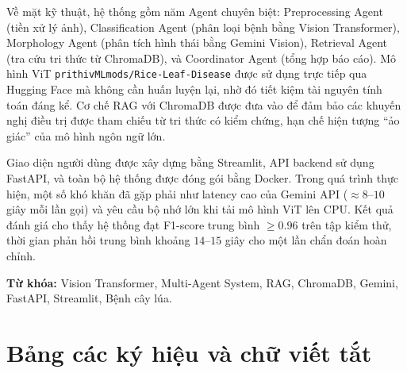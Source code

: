 \documentclass[13pt,a4paper]{extreport}
\begin{document}
Về mặt kỹ thuật, hệ thống gồm năm Agent chuyên biệt: Preprocessing Agent (tiền xử lý ảnh), Classification Agent (phân loại bệnh bằng Vision Transformer), Morphology Agent (phân tích hình thái bằng Gemini Vision), Retrieval Agent (tra cứu tri thức từ ChromaDB), và Coordinator Agent (tổng hợp báo cáo). Mô hình ViT \texttt{prithivMLmods/Rice-Leaf-Disease} được sử dụng trực tiếp qua Hugging Face mà không cần huấn luyện lại, nhờ đó tiết kiệm tài nguyên tính toán đáng kể. Cơ chế RAG với ChromaDB được đưa vào để đảm bảo các khuyến nghị điều trị được tham chiếu từ tri thức có kiểm chứng, hạn chế hiện tượng ``ảo giác'' của mô hình ngôn ngữ lớn.

Giao diện người dùng được xây dựng bằng Streamlit, API backend sử dụng FastAPI, và toàn bộ hệ thống được đóng gói bằng Docker. Trong quá trình thực hiện, một số khó khăn đã gặp phải như latency cao của Gemini API ($\approx 8$--$10$ giây mỗi lần gọi) và yêu cầu bộ nhớ lớn khi tải mô hình ViT lên CPU. Kết quả đánh giá cho thấy hệ thống đạt F1-score trung bình $\geq 0.96$ trên tập kiểm thử, thời gian phản hồi trung bình khoảng $14$--$15$ giây cho một lần chẩn đoán hoàn chỉnh.

\vspace{0.5cm}
\noindent \textbf{Từ khóa:} Vision Transformer, Multi-Agent System, RAG, ChromaDB, Gemini, FastAPI, Streamlit, Bệnh cây lúa.
\clearpage

\tableofcontents
\clearpage
\listoffigures
\clearpage
\listoftables
\clearpage

\chapter*{Bảng các ký hiệu và chữ viết tắt}
\end{document}
